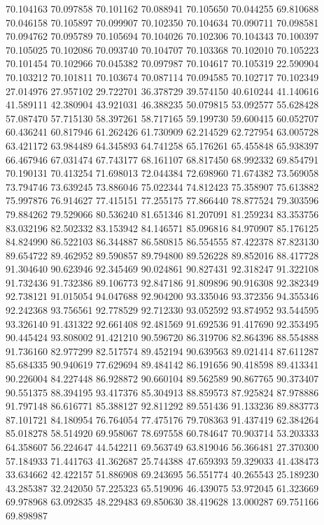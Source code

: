 70.104163
70.097858
70.101162
70.088941
70.105650
70.044255
69.810688
70.046158
70.105897
70.099907
70.102350
70.104634
70.090711
70.098581
70.094762
70.095789
70.105694
70.104026
70.102306
70.104343
70.100397
70.105025
70.102086
70.093740
70.104707
70.103368
70.102010
70.105223
70.101454
70.102966
70.045382
70.097987
70.104617
70.105319
22.590904
70.103212
70.101811
70.103674
70.087114
70.094585
70.102717
70.102349
27.014976
27.957102
29.722701
36.378729
39.574150
40.610244
41.140616
41.589111
42.380904
43.921031
46.388235
50.079815
53.092577
55.628428
57.087470
57.715130
58.397261
58.717165
59.199730
59.600415
60.052707
60.436241
60.817946
61.262426
61.730909
62.214529
62.727954
63.005728
63.421172
63.984489
64.345893
64.741258
65.176261
65.455848
65.938397
66.467946
67.031474
67.743177
68.161107
68.817450
68.992332
69.854791
70.190131
70.413254
71.698013
72.044384
72.698960
71.674382
73.569058
73.794746
73.639245
73.886046
75.022344
74.812423
75.358907
75.613882
75.997876
76.914627
77.415151
77.255175
77.866440
78.877524
79.303596
79.884262
79.529066
80.536240
81.651346
81.207091
81.259234
83.353756
83.032196
82.502332
83.153942
84.146571
85.096816
84.970907
85.176125
84.824990
86.522103
86.344887
86.580815
86.554555
87.422378
87.823130
89.654722
89.462952
89.590857
89.794800
89.526228
89.852016
88.417728
91.304640
90.623946
92.345469
90.024861
90.827431
92.318247
91.322108
91.732436
91.732386
89.106773
92.847186
91.809896
90.916308
92.382349
92.738121
91.015054
94.047688
92.904200
93.335046
93.372356
94.355346
92.242368
93.756561
92.778529
92.712330
93.052592
93.874952
93.544595
93.326140
91.431322
92.661408
92.481569
91.692536
91.417690
92.353495
90.445424
93.808002
91.421210
90.596720
86.319706
82.864396
88.554888
91.736160
82.977299
82.517574
89.452194
90.639563
89.021414
87.611287
85.684335
90.940619
77.629694
89.484142
86.191656
90.418598
89.413341
90.226004
84.227448
86.928872
90.660104
89.562589
90.867765
90.373407
90.551375
88.394195
93.417376
85.304913
88.859573
87.925824
87.978886
91.797148
86.616771
85.388127
92.811292
89.551436
91.133236
89.883773
87.101721
84.180954
76.764054
77.475176
79.708363
91.437419
62.384264
85.018278
58.514920
69.958067
78.697558
60.784647
70.903714
53.203333
64.358607
56.224647
44.542211
69.563749
63.819046
56.366481
27.370300
57.184933
71.441763
41.362687
25.744388
47.659393
59.329033
41.438473
33.634662
42.422157
51.886908
69.243695
56.551774
40.265543
25.189230
43.285387
32.242050
57.225323
65.519096
46.439075
53.972045
61.323669
69.978968
63.092835
48.229483
69.850630
38.419628
13.000287
69.751166
69.898987
